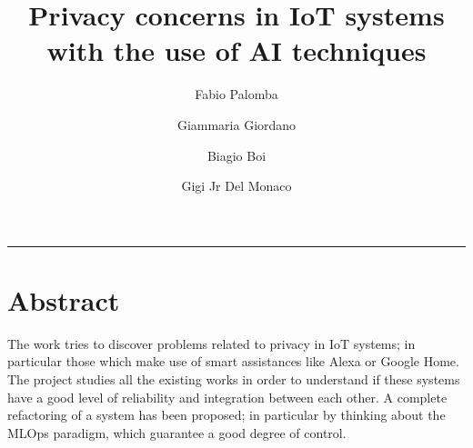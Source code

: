 \documentclass[sigconf]{acmart}
\begin{document}
    \title{Privacy concerns in IoT systems with the use of AI techniques}


    \author{Fabio Palomba}

    \author{Giammaria Giordano}

    \author{Biagio Boi}
    \author{Gigi Jr Del Monaco}

   

    \begin{teaserfigure}
        \rule{\linewidth}{1mm}
    \end{teaserfigure}

    \maketitle

	\section{Abstract}
	The work tries to discover problems related to privacy in IoT systems; in particular those which make use of smart assistances like Alexa or Google Home. 
	The project studies all the existing works in order to understand if these systems have a good level of reliability and integration between each other. A complete refactoring of a  system has been proposed; in particular by thinking about the MLOps paradigm, which guarantee a good degree of control.
\end{document}
